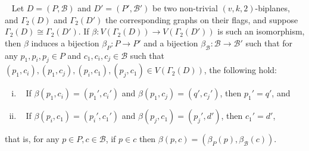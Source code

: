 \documentclass[10pt,a4paper]{amsart}
\begin{document}
\begin{lem}~\label{beta}
    Let $D=(P,\mathcal{B})$ and $D'=(P',\mathcal{B}')$ be two non-trivial $(v,k,2)$-biplanes, and $\Gamma_2(D)$ and $\Gamma_2(D')$ the corresponding graphs on their flags, and suppose $\Gamma_2(D)\cong\Gamma_2(D')$. If $\beta:V(\Gamma_2(D))\to V(\Gamma_2(D'))$ is such an isomorphism, then $\beta$ induces a bijection $\beta_P:P\to P'$ and a bijection $\beta_{\mathcal{B}}:\mathcal{B}\to\mathcal{B}'$ such that
     for any $p_1,p_i,p_j\in P$ and $c_1,c_i,c_j\in\mathcal{B}$ such that $(p_1,c_i),(p_1,c_j),(p_i,c_1),(p_j,c_1)\in V(\Gamma_2(D))$, the following hold:
    \begin{enumerate}[(i)]
        \item~\label{b1} If $\beta(p_1,c_i)=(p_1',c_i')$ and $\beta(p_1,c_j)=(q',c_j')$, then $p_1'=q'$, and
        \item~\label{b2} If $\beta(p_i,c_1)=(p_i',c_1')$ and $\beta(p_j,c_1)=(p_j',d')$, then $c_1'=d'$,
    \end{enumerate}
    that is, for any $p\in P,c\in\mathcal{B}$, if $p\in c$ then $\beta(p,c)=(\beta_P(p),\beta_\mathcal{B}(c))$.
\end{lem}
\end{document}
